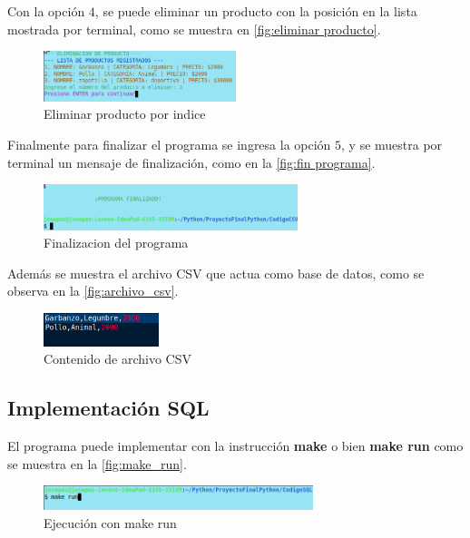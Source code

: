 \documentclass[12pt]{article}
\begin{document}
Con la opción $4$, se puede eliminar un producto con la posición en la lista mostrada por terminal, como se muestra en \autoref{fig:eliminar producto}.

\begin{figure}[H]
	\centering
	\setlength{\fboxrule}{0pt}
	\includegraphics[width=0.5\textwidth]{Imagenes/eliminar_producto.png}
	\caption{Eliminar producto por indice}
	\label{fig:eliminar producto}
\end{figure} 

Finalmente para finalizar el programa se ingresa la opción $5$, y se muestra por terminal un mensaje de finalización, como en la \autoref{fig:fin programa}.
\begin{figure}[H]
	\centering
	\setlength{\fboxrule}{0pt}
	\includegraphics[width=0.66\textwidth]{Imagenes/finalizar_programa.png}
	\caption{Finalizacion del programa}
	\label{fig:fin programa}
\end{figure} 

Además se muestra el archivo CSV que actua como base de datos, como se observa en la \autoref{fig:archivo_csv}.

\begin{figure}[H]
	\centering
	\setlength{\fboxrule}{0pt}
	\includegraphics[width=0.3\textwidth]{Imagenes/archivo_csv.png}
	\caption{Contenido de archivo CSV}
	\label{fig:archivo_csv}
\end{figure} 


\subsection{Implementación SQL}

El programa puede implementar con la instrucción \textbf{make} o bien \textbf{make run} como se muestra en la \autoref{fig:make_run}.

\begin{figure}[H]
	\centering
	\setlength{\fboxrule}{0pt}
	\includegraphics[width=0.7\textwidth]{Imagenes/make_run.png}
	\caption{Ejecución con make run}
	\label{fig:make_run}
\end{figure}  
\end{document}

